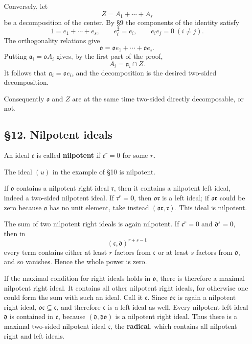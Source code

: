 \documentclass[
  11pt,
]{article}
\begin{document}
Conversely, let \[
  Z=A_1+\cdots+A_s
\] be a decomposition of the center. By §9 the components of the
identity satisfy \[
  1=e_1+\cdots+e_s,
  \qquad e_i^2=e_i,
  \qquad e_ie_j=0\ (i\ne j).
\] The orthogonality relations give \[
  \mathfrak{o}=\mathfrak{o}e_1+\cdots+\mathfrak{o}e_s.
\] Putting \(\mathfrak a_i=\mathfrak{o}A_i\) gives, by the first part of
the proof, \[
  A_i=\mathfrak a_i\cap Z.
\] It follows that \(\mathfrak a_i=\mathfrak{o}e_i\), and the
decomposition is the desired two-sided decomposition.

Consequently \(\mathfrak{o}\) and \(Z\) are at the same time two-sided
directly decomposable, or not.

\subsection{§12. Nilpotent ideals}\label{nilpotent-ideals}

An ideal \(\mathfrak c\) is called \textbf{nilpotent} if
\(\mathfrak c^r=0\) for some \(r\).

The ideal \((u)\) in the example of §10 is nilpotent.

If \(\mathfrak{o}\) contains a nilpotent right ideal \(\mathfrak r\),
then it contains a nilpotent left ideal, indeed a two-sided nilpotent
ideal. If \(\mathfrak r^r=0\), then \(\mathfrak{o}\mathfrak r\) is a
left ideal; if \(\mathfrak{o}\mathfrak r\) could be zero because
\(\mathfrak{o}\) has no unit element, take instead
\((\mathfrak{o}\mathfrak r,\mathfrak r)\). This ideal is nilpotent.

The sum of two nilpotent right ideals is again nilpotent. If
\(\mathfrak c^r=0\) and \(\mathfrak d^s=0\), then in \[
  (\mathfrak c,\mathfrak d)^{r+s-1}
\] every term contains either at least \(r\) factors from
\(\mathfrak c\) or at least \(s\) factors from \(\mathfrak d\), and so
vanishes. Hence the whole power is zero.

If the maximal condition for right ideals holds in \(\mathfrak{o}\),
there is therefore a maximal nilpotent right ideal. It contains all
other nilpotent right ideals, for otherwise one could form the sum with
such an ideal. Call it \(\mathfrak c\). Since
\(\mathfrak{o}\mathfrak c\) is again a nilpotent right ideal,
\(\mathfrak{o}\mathfrak c\subseteq\mathfrak c\), and therefore
\(\mathfrak c\) is a left ideal as well. Every nilpotent left ideal
\(\mathfrak d\) is contained in \(\mathfrak c\), because
\((\mathfrak d,\mathfrak d\mathfrak{o})\) is a nilpotent right ideal.
Thus there is a maximal two-sided nilpotent ideal \(\mathfrak c\), the
\textbf{radical}, which contains all nilpotent right and left ideals.
\end{document}
